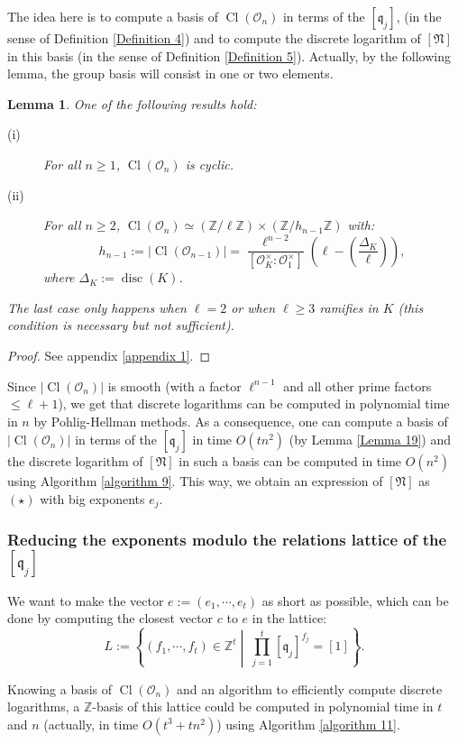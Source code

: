 \documentclass[a4paper,10pt]{report}
\theoremstyle{definition}
\theoremstyle{plain}
\newtheorem{Lemma}[Definition]{Lemma}
\theoremstyle{definition}
\newcommand{\Z}{\mathbb{Z}}
\newcommand{\mO}{\mathcal{O}}
\renewcommand{\(}{\left(}
\renewcommand{\)}{\right)}
\newcommand{\mf}[1]{\mathfrak{#1}}
\DeclareMathOperator{\disc}{disc}
\DeclareMathOperator{\Cl}{Cl}
\begin{document}
The idea here is to compute a basis of $\Cl(\mO_n)$ in terms of the $[\mf{q}_j]$, (in the sense of Definition \ref{Definition 4}) and to compute the discrete logarithm of $[\mf{N}]$ in this basis (in the sense of Definition \ref{Definition 5}). Actually, by the following lemma, the group basis will consist in one or two elements.

\begin{Lemma}\label{Lemma 20}
One of the following results hold:

\begin{description}
\item[(i)] For all $n\geq 1$, $\Cl(\mO_n)$ is cyclic.
\item[(ii)] For all $n\geq 2$, $\Cl(\mO_n)\simeq (\Z/\ell\Z)\times(\Z/h_{n-1}\Z)$ with:
\[h_{n-1}:=|\Cl(\mO_{n-1})|=\frac{\ell^{n-2}}{[\mO_K^\times:\mO_1^\times]}\(\ell-\(\frac{\Delta_K}{\ell}\)\),\]
where $\Delta_K:=\disc(K)$.
\end{description}
The last case only happens when $\ell=2$ or when $\ell\geq 3$ ramifies in $K$ (this condition is necessary but not sufficient). 
\end{Lemma} 

\begin{proof}
See appendix \ref{appendix 1}.
\end{proof}

Since $|\Cl(\mO_n)|$ is smooth (with a factor $\ell^{n-1}$ and all other prime factors $\leq \ell+1$), we get that discrete logarithms can be computed in polynomial time in $n$ by Pohlig-Hellman methods. As a consequence, one can compute a basis of $|\Cl(\mO_n)|$ in terms of the $[\mf{q}_j]$ in time $O(tn^2)$ (by Lemma \ref{Lemma 19}) and the discrete logarithm of $[\mf{N}]$ in such a basis can be computed in time $O(n^2)$ using Algorithm \ref{algorithm 9}. This way, we obtain an expression of $[\mf{N}]$ as $(\star)$ with big exponents $e_j$.


\subsubsection{Reducing the exponents modulo the relations lattice of the $[\mf{q}_j]$}\label{paragraph 16}

We want to make the vector $e:=(e_1, \cdots, e_t)$ as short as possible, which can be done by computing the closest vector $c$ to $e$ in the lattice:
\[L:=\left\{(f_1,\cdots,f_{t})\in\Z^{t} \middle| \  \prod_{j=1}^t[\mf{q}_j]^{f_j}=[1]\right\}.\]

Knowing a basis of $\Cl(\mO_n)$ and an algorithm to efficiently compute discrete logarithms, a $\Z$-basis of this lattice could be computed in polynomial time in $t$ and $n$ (actually, in time $O(t^3+tn^2)$) using Algorithm \ref{algorithm 11}.
\end{document}
